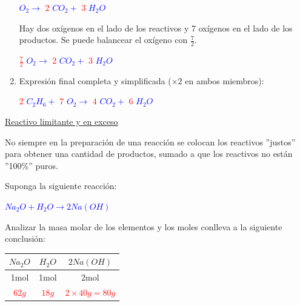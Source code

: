 \begin{enumerate}
                \begin{center} 
                \textcolor{blue}{$O_2 \rightarrow$} \textcolor{red}{$2$} \textcolor{blue}{$CO_2 + $} \textcolor{red}{$3$} \textcolor{blue}{$H_2O$}
                \end{center}

                \indent Hay dos oxígenos en el lado de los reactivos y 7 oxígenos en el lado de los productos. Se puede balancear el oxígeno con $\frac{7}{2}$.

                \begin{center} 
                    \textcolor{red}{$\frac{7}{2}$} \textcolor{blue}{$O_2 \rightarrow$} \textcolor{red}{$2$} \textcolor{blue}{$CO_2 + $} \textcolor{red}{$3$} \textcolor{blue}{$H_2O$}
                \end{center}

                \item Expresión final completa y simplificada ($\times 2$ en ambos miembros):

                \begin{center} 
                    \textcolor{red}{2} \textcolor{blue}{$C_2H_6 +$} \textcolor{red}{$7$} \textcolor{blue}{$O_2 \rightarrow$} \textcolor{red}{$4$} \textcolor{blue}{$CO_2 + $} \textcolor{red}{$6$} \textcolor{blue}{$H_2O$}
                \end{center}
            \end{enumerate}

            \begin{center} \underline{Reactivo limitante y en exceso} \end{center}
            \indent No siempre en la preparación de una reacción se colocan los reactivos ''justos'' para obtener una cantidad de productos, sumado a que los reactivos no están ''100\%'' puros. \\[30pt]
            \columnbreak

                \indent Suponga la siguiente reacción:
                \begin{center} 
                    \textcolor{blue}{$Na_2O + H_2O \rightarrow 2Na(OH)$}
                \end{center}

                \indent Analizar la masa molar de los elementos y los moles conlleva a la siguiente conclusión:
                \begin{center}
                    \begin{tabular}{| c | c | c |} 
                        \hline
                        $Na_2O$  &   $H_2O$   &   $2Na(OH)$ \\
                        \hline
                        1mol     &   1mol     &     2mol    \\
                        \hline
                        \textcolor{red}{$62g$}      &   \textcolor{red}{$18g$}      &     \textcolor{red}{$2 \times 40g = 80g$} \\
                        \hline
                    \end{tabular}
                \end{center}

